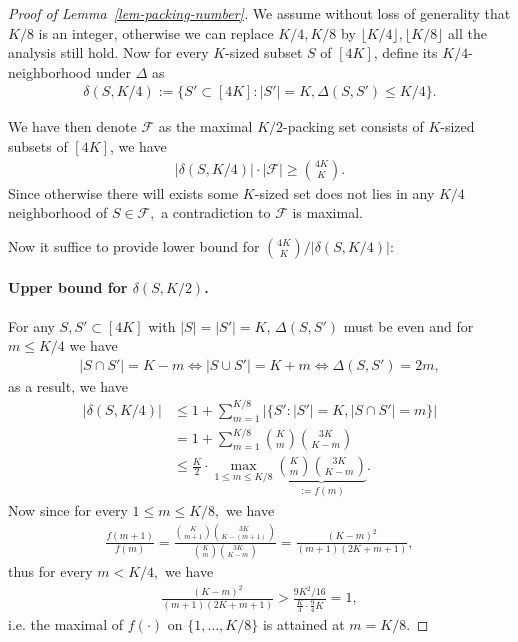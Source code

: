 \documentclass[10pt, letterpaper]{article}
\begin{document}
\begin{proof}[Proof of Lemma~\ref{lem-packing-number}]
We assume without loss of generality that $K/8$ is an integer, otherwise we can replace $K/4,K/8$ by $\lfloor K/4\rfloor,\lfloor K/8\rfloor$ all the analysis still hold. Now for every $K$-sized subset $S$ of $[4K]$, define its $K/4$-neighborhood under $\Delta$ as \begin{align*}
    \delta(S,K/4):= \{S'\subset [4K]: \lvert S' \rvert = K, \Delta(S,S') \leq K/4 \}.
\end{align*}

We have then denote $\mathcal{F}$ as the maximal $K/2$-packing set consists of $K$-sized subsets of $[4K]$, we have \begin{align*}
    \lvert \delta(S,K/4)\rvert \cdot \lvert \mathcal{F} \rvert \geq \binom{4K}{K}.
\end{align*}
Since otherwise there will exists some $K$-sized set does not lies in any $K/4$ neighborhood of $S\in \mathcal{F},$ a contradiction to $\mathcal{F}$ is maximal. 

Now it suffice to provide lower bound for $\binom{4K}{K}/\lvert \delta(S,K/4)\rvert:$

\paragraph{Upper bound for $\delta(S,K/2)$.} For any  $S,S'\subset [4K]$ with $\lvert S \rvert = \lvert S'\rvert = K$, $\Delta(S,S')$ must be even and for $m\leq K/4$ we have \begin{align*}
    \lvert S\cap S'\rvert  = K-m \iff \lvert S\cup S'\rvert = K+m  \iff \Delta(S,S') = 2m,  
\end{align*}
as a result, we have \begin{align*}
    \lvert \delta(S,K/4) \rvert &\leq 1+\sum_{m=1}^{ K/8 }\lvert \{S':\lvert S'\rvert = K, \lvert S\cap S'\rvert = m\}\rvert \\
    &=1+ \sum_{m=1}^{ K/8 } \binom{K}{m}\binom{3K}{K-m} \\
    &\leq \frac{K}{2}\cdot \max_{1\leq m\leq  K/8 } \underbrace{\binom{K}{m}\binom{3K}{K-m}}_{:= f(m)}.
\end{align*}
Now since for every $1\leq m\leq  K/8,$ we have \begin{align*}
    \frac{f(m+1)}{f(m)} = \frac{\binom{K}{m+1}\binom{3K}{K-(m+1)} }{\binom{K}{m}\binom{3K}{K-m}} = \frac{(K-m)^2}{(m+1)(2K+m+1)},
\end{align*}
thus for every $m< K/4,$ we have \begin{align*}
    \frac{(K-m)^2}{(m+1)(2K+m+1)} > \frac{{9}K^2/{16}}{\frac{K}{4}\cdot \frac{9}{4}K   } =1,
\end{align*}
i.e. the maximal of $f(\cdot)$ on $\{1,\dots, K/8 \}$ is attained at $m = K/8.$


\end{proof}
\end{document}
